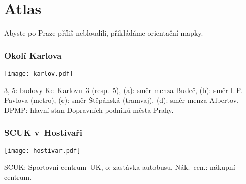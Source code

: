 \section{Atlas}
Abyste po Praze příliš nebloudili, přikládáme orientační mapky.

\subsubsection{Okolí Karlova}

\begin{center}\texttt{[image: karlov.pdf]}\end{center}

 3, 5: budovy Ke~Karlovu~3 (resp.~5),
(a): směr menza Budeč, (b): směr I.$\,$P.$\,$Pavlova (metro),
(c): směr Štěpánská (tramvaj), (d): směr menza Albertov,
DPMP: hlavní stan Dopravních podniků města Prahy.

\subsubsection{SCUK v~Hostivaři}
\begin{center}\texttt{[image: hostivar.pdf]}\end{center}

 SCUK: Sportovní centrum~UK, o: zastávka autobusu, Nák.~cen.: nákupní centrum.